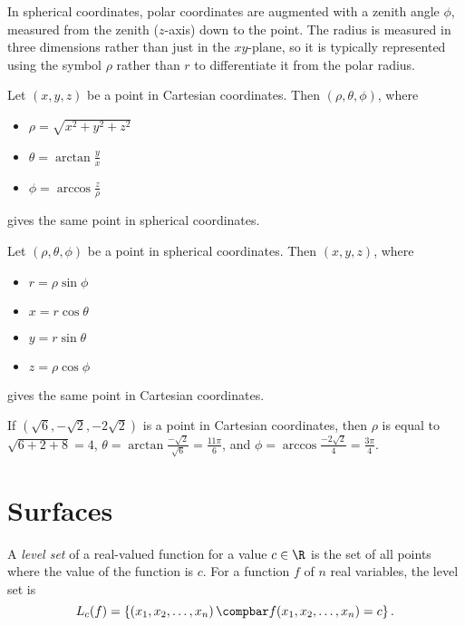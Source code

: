 \documentclass[12pt]{article}
\begin{document}
In spherical coordinates, polar coordinates are augmented with a zenith angle $\phi$, measured from the zenith ($z$-axis) down to the point. The radius is measured in three dimensions rather than just in the $xy$-plane, so it is typically represented using the symbol $\rho$ rather than $r$ to differentiate it from the polar radius.

\begin{thm}
    Let $(x, y, z)$ be a point in Cartesian coordinates. Then $(\rho, \theta, \phi)$, where
    \begin{itemize}
        \item $\rho = \sqrt{x^2 + y^2 + z^2}$
        \item $\theta = \arctan\frac{y}{x}$
        \item $\phi = \arccos\frac{z}{\rho}$
    \end{itemize} gives the same point in spherical coordinates.
\end{thm}

\begin{thm}
    Let $(\rho, \theta, \phi)$ be a point in spherical coordinates. Then $(x, y, z)$, where
    \begin{itemize}
        \item $r = \rho\sin\phi$
        \item $x = r\cos\theta$
        \item $y = r\sin\theta$
        \item $z = \rho\cos\phi$
    \end{itemize} gives the same point in Cartesian coordinates.
\end{thm}

\begin{exmp}
    If $(\sqrt{6}, -\sqrt{2}, -2\sqrt{2})$ is a point in Cartesian coordinates, then $\rho$ is equal to $\sqrt{6 + 2 + 8} = 4$, $\theta = \arctan\frac{-\sqrt{2}}{\sqrt{6}} = \frac{11\pi}{6}$, and $\phi = \arccos\frac{-2\sqrt{2}}{4} = \frac{3\pi}{4}$.
\end{exmp}

\section{Surfaces}

\begin{defn}
    A \emph{level set} of a real-valued function for a value $c \in \R$ is the set of all points where the value of the function is $c$. For a function $f$ of $n$ real variables, the level set is \[L_c(f) = \left\{\left(x_1, x_2, \ldots, x_n\right) \compbar f(x_1, x_2, \ldots, x_n) = c\right\}.\]
\end{defn}
\end{document}
